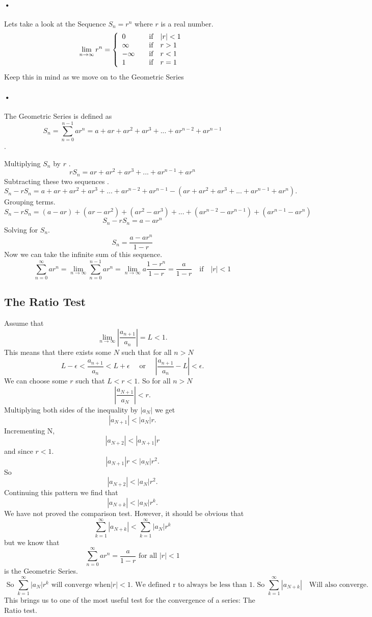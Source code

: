 \documentclass[font =22]{report}
\begin{document}
\paragraph{•}
Lets take a look at the Sequence $S_n = r^n $ where $r$ is a real number. 
\[
\lim_{n\to\infty}r^n = \left\{ 
  \begin{array}{l l}
    0 & \quad \text{if} \quad|r|<1\\
    \infty & \quad \text{if} \quad r>1\\
    -\infty & \quad \text{if} \quad r<1\\
    1 & \quad \text{if} \quad r=1
  \end{array} \right.
  \]
  Keep this in mind as we move on to the Geometric Series
\paragraph{•}
The Geometric Series is defined as $$S_n = \sum_{n = 0}^{n-1}ar^n = a + ar+ ar^2+ar^3+...+ar^{n-2}+ar^{n-1}$$.

Multiplying $S_n$ by $r$ .
\[
rS_n = ar + ar^2 +ar^3+...+ar^{n-1}+ar^n
\]
Subtracting these two sequences .
\[
S_n - rS_n = a + ar+ ar^2+ar^3+...+ar^{n-2}+ar^{n-1}
			-(ar + ar^2 +ar^3+...+ar^{n-1}+ar^n).
\]
Grouping terms.
\[
S_n - rS_n = (a-ar)+ (ar-ar^2)+ (ar^2- ar^3) +...+(ar^{n-2}-ar^{n-1})+(ar^{n-1}-ar^n)
\]
\[
S_n - rS_n = a - ar^n
\]
Solving for $S_n$.
\[
S_n = \frac{a - ar^n}{1-r}
\]
Now we can take the infinite sum of this sequence. 
\[
\sum_{n = 0}^\infty ar^n = \lim_{n\to\infty} \sum_{n = 0}^{n-1} ar^n = \lim_{n\to\infty} a\frac{1-r^n}{1-r} = \frac{a}{1-r} \quad \text{if} \quad |r|<1
\]
\subsection*{The Ratio Test}
Assume that 
\[
\lim_{n\to \infty}\left\lvert{\frac{a_{n+1}}{a_n}}\right\lvert = L<1.
\]
This means that there exists some $N$ such that for all $n>N$ 
\[
L-\epsilon<\frac{a_{n+1}}{a_n}<L+\epsilon \quad \text{ or } \quad  \left\lvert \frac{a_{n+1}}{a_n} -L \right\lvert <\epsilon.
\]
We can choose some $r$ such that $L<r<1$. So for all $n>N$
\[
\left\lvert \frac{a_{N+1}}{a_N}  \right\lvert <r.
\] 
Multiplying both sides of the inequality by $|a_N|$ we get 
\[
|a_{N+1}|<|a_N|r.
\]
Incrementing N,
\[
|a_{N+2}|<|a_{N+1}|r
\] 
and since $r<1$.
\[
|a_{N+1}|r<|a_N|r^2.
\]
So
\[
|a_{N+2}|<|a_N|r^2.
\]
Continuing this pattern we find that 
\[
|a_{N+k}|<|a_N|r^k.
\]
We have not proved the comparison test. However, it should be obvious that 
\[
\sum_{k=1}^\infty |a_{N+k}| < \sum_{k=1}^\infty |a_N|r^k
\]
but we know that 
\[
\sum_{n = 0}^\infty ar^n = \frac{a}{1-r}  \text{ for all } |r|<1
\] 
is the Geometric Series.
\[
\text { So }\sum_{k=1}^\infty |a_N|r^k \text{ will converge when} |r|<1. \text{ We defined r to always be less than 1. So }  \sum_{k=1}^\infty |a_{N+k}| \quad \text{Will also converge.}
\] 
This brings us to one of the most useful test for the convergence of a series: The Ratio test.\newline
\end{document}
